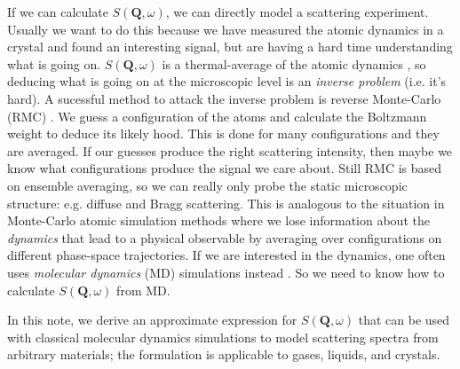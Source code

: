\documentclass[11pt,prb,aps,nofootinbib,superscriptaddress,floatfix]{revtex4-2}
\begin{document}
If we can calculate $S(\bm{Q},\omega)$, we can directly model a scattering experiment. Usually we want to do this because we have measured the atomic dynamics in a crystal and found an interesting signal, but are having a hard time understanding what is going on. $S(\bm{Q},\omega)$ is a thermal-average of the atomic dynamics \cite{dove1993introduction}, so deducing what is going on at the microscopic level is an \emph{inverse problem} (i.e. it's hard). A sucessful method to attack the inverse problem is reverse Monte-Carlo (RMC) \cite{morganRmcdiscordReverseMonte2021}. We guess a configuration of the atoms and calculate the Boltzmann weight to deduce its likely hood. This is done for many configurations and they are averaged. If our guesses produce the right scattering intensity, then maybe we know what configurations produce the signal we care about. Still RMC is based on ensemble averaging, so we can really only probe the static microscopic structure: e.g. diffuse and Bragg scattering. This is analogous to the situation in Monte-Carlo atomic simulation methods where we lose information about the \emph{dynamics} that lead to a physical observable by averaging over configurations on different phase-space trajectories. If we are interested in the dynamics, one often uses \emph{molecular dynamics} (MD) simulations instead \cite{allen2017computer}. So we need to know how to calculate $S(\bm{Q},\omega)$ from MD.

In this note, we derive an approximate expression for $S(\bm{Q},\omega)$ that can be used with classical molecular dynamics simulations to model scattering spectra from arbitrary materials; the formulation is applicable to gases, liquids, and crystals. 
\end{document}
